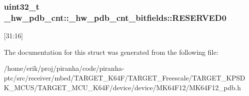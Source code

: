 \subsubsection[{\texorpdfstring{R\+E\+S\+E\+R\+V\+E\+D0}{RESERVED0}}]{\setlength{\rightskip}{0pt plus 5cm}uint32\+\_\+t \+\_\+hw\+\_\+pdb\+\_\+cnt\+::\+\_\+hw\+\_\+pdb\+\_\+cnt\+\_\+bitfields\+::\+R\+E\+S\+E\+R\+V\+E\+D0}\hypertarget{struct__hw__pdb__cnt_1_1__hw__pdb__cnt__bitfields_abac1a3498f30251f2d87dde6782b463c}{}\label{struct__hw__pdb__cnt_1_1__hw__pdb__cnt__bitfields_abac1a3498f30251f2d87dde6782b463c}
\mbox{[}31\+:16\mbox{]} 

The documentation for this struct was generated from the following file\+:\begin{DoxyCompactItemize}
\item 
/home/erik/proj/piranha/code/piranha-\/ptc/src/receiver/mbed/\+T\+A\+R\+G\+E\+T\+\_\+\+K64\+F/\+T\+A\+R\+G\+E\+T\+\_\+\+Freescale/\+T\+A\+R\+G\+E\+T\+\_\+\+K\+P\+S\+D\+K\+\_\+\+M\+C\+U\+S/\+T\+A\+R\+G\+E\+T\+\_\+\+M\+C\+U\+\_\+\+K64\+F/device/device/\+M\+K64\+F12/M\+K64\+F12\+\_\+pdb.\+h\end{DoxyCompactItemize}
